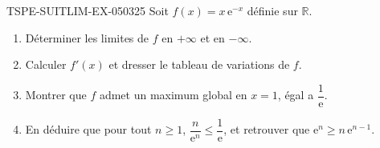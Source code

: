 \begin{exercice}{TSPE-SUITLIM-EX-050}{3}{25}
Soit $f(x) = x\,\mathrm{e}^{-x}$ définie sur $\mathbb{R}$.
\begin{enumerate}
  \item Déterminer les limites de $f$ en $+\infty$ et en $-\infty$.
  \item Calculer $f'(x)$ et dresser le tableau de variations de $f$.
  \item Montrer que $f$ admet un maximum global en $x = 1$, égal a $\dfrac{1}{\mathrm{e}}$.
  \item En déduire que pour tout $n \geq 1$, $\dfrac{n}{\mathrm{e}^n} \leq \dfrac{1}{\mathrm{e}}$, et retrouver que $\mathrm{e}^n \geq n\,\mathrm{e}^{n-1}$.
\end{enumerate}
\end{exercice}
